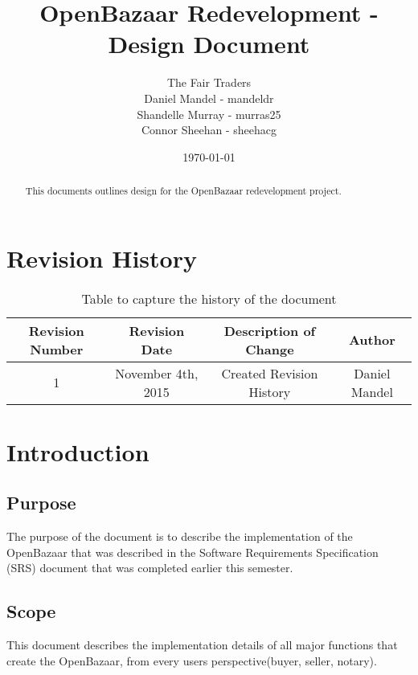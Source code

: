 \documentclass{article}
\begin{document}
\title{OpenBazaar Redevelopment - Design Document}
\author{The Fair Traders \\ Daniel Mandel - mandeldr \\ Shandelle Murray - murras25 \\ Connor Sheehan - sheehacg}
\date{\today}
\maketitle

\begin{abstract}
This documents outlines design for the OpenBazaar redevelopment project.
\end{abstract}

\newpage

\tableofcontents

\section*{Revision History}

\begin{table}[h!]
\centering
\begin{tabular}{||c c c c||}
 \hline
 Revision Number & Revision Date & Description of Change & Author \\ [0.5ex]
 \hline\hline
 1 & November 4th, 2015 & Created Revision History & Daniel Mandel \\ [1ex]
 \hline
\end{tabular}
\caption{Table to capture the history of the document}
\label{table:1}
\end{table}

\section*{Introduction}
\subsection{Purpose}
The purpose of the document is to describe the implementation of the OpenBazaar that was described in the Software Requirements Specification (SRS) document that was completed earlier this semester.

\subsection{Scope}
This document describes the implementation details of all major functions that create the OpenBazaar, from every users perspective(buyer, seller, notary).
\end{document}
